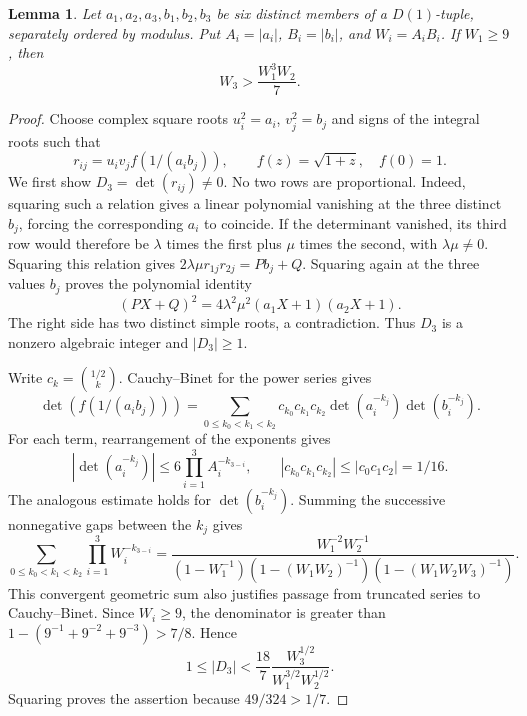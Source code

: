 \documentclass[12pt]{article}
\newtheorem{lemma}[theorem]{Lemma}
\numberwithin{equation}{section}
\begin{document}
\begin{lemma}\label{sm:crossblock}
Let $a_1,a_2,a_3,b_1,b_2,b_3$ be six distinct members of a
$D(1)$-tuple, separately ordered by modulus. Put
$A_i=|a_i|$, $B_i=|b_i|$, and $W_i=A_iB_i$.
If $W_1\ge9$, then
\[
 W_3>\frac{W_1^3W_2}{7}.
\]
\end{lemma}
\begin{proof}
Choose complex square roots $u_i^2=a_i$, $v_j^2=b_j$ and signs
of the integral roots such that
\[
 r_{ij}=u_iv_j f(1/(a_i b_j)),\qquad f(z)=\sqrt{1+z},\quad f(0)=1.
\]
We first show $D_3=\det(r_{ij})\ne0$. No two rows are proportional. Indeed,
squaring such a relation gives a linear polynomial vanishing at the
three distinct $b_j$, forcing the corresponding $a_i$ to coincide.
If the determinant vanished, its third row would therefore be
$\lambda$ times the first plus $\mu$ times the second, with
$\lambda\mu\ne0$. Squaring this relation gives
$2\lambda\mu r_{1j}r_{2j}=Pb_j+Q$. Squaring again at the three
values $b_j$ proves the polynomial identity
\[
 (PX+Q)^2=4\lambda^2\mu^2(a_1X+1)(a_2X+1).
\]
The right side has two distinct simple roots, a contradiction.
Thus $D_3$ is a nonzero algebraic integer and $|D_3|\ge1$.

Write $c_k=\binom{1/2}{k}$. Cauchy--Binet for the power series gives
\[
 \det(f(1/(a_i b_j)))=
 \sum_{0\le k_0<k_1<k_2}
  c_{k_0}c_{k_1}c_{k_2}
  \det(a_i^{-k_j})\det(b_i^{-k_j}).
\]
For each term, rearrangement of the exponents gives
\[
 |\det(a_i^{-k_j})|\le6\prod_{i=1}^3A_i^{-k_{3-i}},
 \qquad |c_{k_0}c_{k_1}c_{k_2}|\le|c_0c_1c_2|=1/16.
\]
The analogous estimate holds for $\det(b_i^{-k_j})$. Summing the successive
nonnegative gaps between the $k_j$ gives
\[
 \sum_{0\le k_0<k_1<k_2}\prod_{i=1}^3W_i^{-k_{3-i}}
 =\frac{W_1^{-2}W_2^{-1}}
 {(1-W_1^{-1})(1-(W_1W_2)^{-1})(1-(W_1W_2W_3)^{-1})}.
\]
This convergent geometric sum also justifies passage from truncated
series to Cauchy--Binet. Since $W_i\ge9$, the denominator is greater
than $1-(9^{-1}+9^{-2}+9^{-3})>7/8$. Hence
\[
 1\le|D_3|<\frac{18}{7}\frac{W_3^{1/2}}{W_1^{3/2}W_2^{1/2}}.
\]
Squaring proves the assertion because $49/324>1/7$.
\end{proof}
\end{document}
